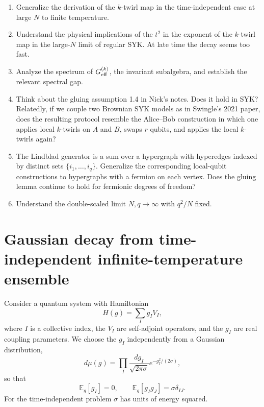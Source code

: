 \documentclass{article}
\theoremstyle{definition}
\begin{document}
\begin{enumerate}
\item Generalize the derivation of the $k$-twirl map in the time-independent
case at large $N$ to finite temperature.

\item Understand the physical implications of the $t^2$ in the exponent of
the $k$-twirl map in the large-$N$ limit of regular SYK.  At late time the
decay seems too fast.

\item Analyze the spectrum of $G_{\rm eff}^{(k)}$, the invariant subalgebra,
and establish the relevant spectral gap.

\item Think about the gluing assumption 1.4 in Nick's notes.  Does it hold in
SYK?  Relatedly, if we couple two Brownian SYK models as in Swingle's 2021
paper, does the resulting protocol resemble the Alice--Bob construction in
which one applies local $k$-twirls on $A$ and $B$, swaps $r$ qubits, and
applies the local $k$-twirls again?

\item The Lindblad generator is a sum over a hypergraph with hyperedges
indexed by distinct sets $\{i_1,\ldots,i_q\}$.  Generalize the corresponding
local-qubit constructions to hypergraphs with a fermion on each vertex.
Does the gluing lemma continue to hold for fermionic degrees of freedom?

\item Understand the double-scaled limit $N,q\to\infty$ with $q^2/N$ fixed.
\end{enumerate}


\section{Gaussian decay from time-independent infinite-temperature ensemble}

Consider a quantum system with Hamiltonian
\begin{equation}
    H(g)=\sum_I g_I V_I,
\end{equation}
where $I$ is a collective index, the $V_I$ are self-adjoint operators, and
the $g_I$ are real coupling parameters.  We choose the $g_I$ independently
from a Gaussian distribution,
\begin{equation}
    d\mu(g)
    =\prod_I
    \frac{dg_I}{\sqrt{2\pi\sigma}}
    e^{-g_I^2/(2\sigma)},
\end{equation}
so that
\begin{equation}
    \mathbb E_g[g_I]=0,
    \qquad
    \mathbb E_g[g_Ig_J]=\sigma\delta_{IJ}.
\end{equation}
For the time-independent problem $\sigma$ has units of energy squared.
\end{document}
